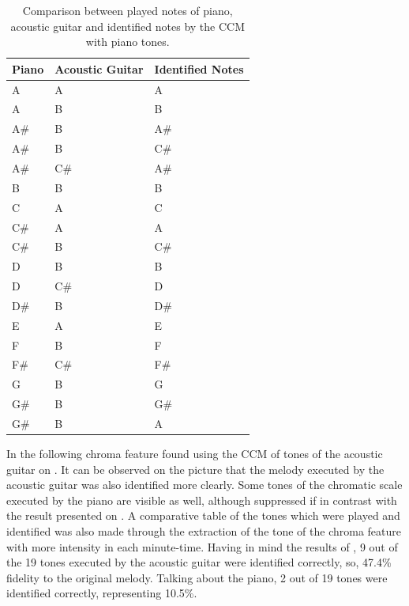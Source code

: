 \documentclass{article}
\begin{document}
	\begin{table}[h!]
	 \begin{center}
	 \begin{tabular}{|l|l|l|}
	  \hline
	  Piano & Acoustic Guitar & Identified Notes \\
	  \hline
		A	& A	& A \\
		A	&    B	&    B \\
		A\#	&    B	&    A\# \\
		A\#	&    B	&    C\# \\
		A\#	&    C\#	&    A\# \\
		B	&    B	&    B \\
		C	&    A	&    C \\
		C\#	&    A	&    A \\
		C\#	&    B	&    C\# \\
		D	&    B	&    B \\
		D	&    C\#	&    D \\
		D\#	&    B	&    D\# \\
		E	&    A	&    E \\
		F	&    B	&    F \\
		F\#	&    C\#	&    F\# \\
		G	&    B	&    G \\
		G\#	&    B	&    G\# \\
		G\#	&    B	&    A \\
	  \hline
	 \end{tabular}
	\end{center}
	 \caption{Comparison between played notes of piano, acoustic guitar and identified notes by the CCM with piano tones.}
	 \label{tab:table-2-ccm-piano}
	\end{table}


In the following chroma feature found using the CCM of tones of the acoustic guitar on . It can be observed on the picture that the melody executed by the acoustic guitar was also identified more clearly. Some tones of the chromatic scale executed by the piano are visible as well, although suppressed if in contrast with the result presented on . A comparative table of the tones which were played and identified was also made through the extraction of the tone of the chroma feature with more intensity in each minute-time. Having in mind the results of , 9 out of the 19 tones executed by the acoustic guitar were identified correctly, so, 47.4\% fidelity to the original melody. Talking about the piano, 2 out of 19 tones were identified correctly, representing 10.5\%. 
	
\end{document}
